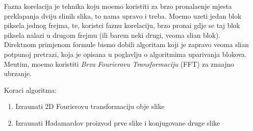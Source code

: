 Fazna korelacija je tehnika koju mo\zh emo koristiti za brzo pronala\zh enje mjesta preklapanja dviju sli\ch nih slika, \sh to nama upravo i treba. Mo\zh emo uzeti jedan blok piksela jednog frejma, te, koriste\cj i faznu korelaciju, brzo prona\cj i
gdje se taj blok piksela nalazi u drugom frejmu (ili barem neki drugi, veoma sli\ch an blok). Direktnom primjenom formule bismo dobili algoritam koji je zapravo veoma sli\ch an potpunoj pretrazi, koja je opisana u poglavlju o algoritmima
uparivanja blokova. Me\dj utim, mo\zh emo koristiti \textit{Brzu Fourierovu Transformaciju} (FFT) za zna\ch ajno ubrzanje.

Koraci algoritma:
\begin{enumerate}
\item Izra\ch unati 2D Fourierovu transformaciju obje slike
\item Izra\ch unati Hadamardov proizvod prve slike i konjugovane druge slike
\end{enumerate}